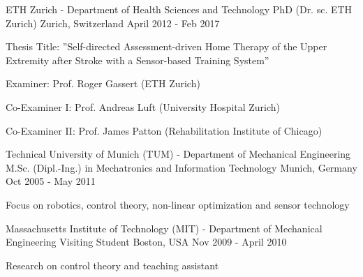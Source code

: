 

\begin{cventries}

  \cventry
    {ETH Zurich - Department of Health Sciences and Technology} %
    {PhD (Dr. sc. ETH Zurich)} %
    {Zurich, Switzerland} %
    {April 2012 - Feb 2017} %
    {
      \begin{cvitems} %
        \item {Thesis Title: {''Self-directed Assessment-driven Home Therapy of 					the Upper Extremity after Stroke with a Sensor-based Training 					System''}}
        \item{Examiner: Prof. Roger Gassert (ETH Zurich)}
        \item{Co-Examiner I: Prof. Andreas Luft (University Hospital Zurich)}
        \item{Co-Examiner II: Prof. James Patton (Rehabilitation Institute of Chicago)}	
      \end{cvitems}
    }

  \cventry
    {Technical University of Munich (TUM) - Department of Mechanical Engineering} %
    {M.Sc. (Dipl.-Ing.) in Mechatronics and Information Technology} %
    {Munich, Germany} %
    {Oct 2005 - May 2011} %
    {
      \begin{cvitems} %
        \item {Focus on robotics, control theory, non-linear optimization and sensor technology}
      \end{cvitems}
    }


\cventry
    {Massachusetts Institute of Technology (MIT) -  Department of Mechanical Engineering} %
     {Visiting Student} %
    {Boston, USA} %
    {Nov 2009 - April 2010} %
    {
      \begin{cvitems} %
        \item {Research on control theory and teaching assistant}       
      \end{cvitems}
	}

\end{cventries}
